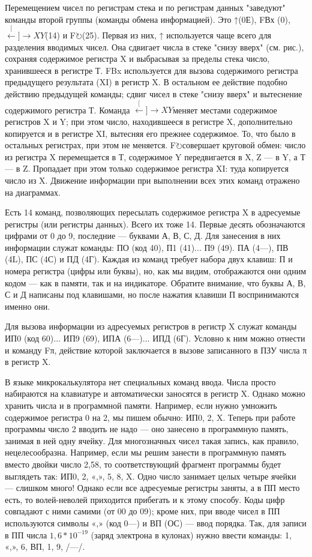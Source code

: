 \documentclass[11pt,a4paper,oneside]{article}
\def\XY{$\stackrel[\leftarrow]{\rightarrow}{XY}$}
\def\FO{F$\circlearrowright$}
\begin{document}
Перемещением чисел по регистрам стека и по регистрам данных "заведуют" команды второй группы (команды обмена информацией). Это ↑(0Е), FВх (0), \XY (14) и \FO (25). Первая из них, ↑ используется чаще всего для разделения вводимых чисел. Она сдвигает числа в стеке "снизу вверх" (см. рис.), сохраняя содержимое регистра X и выбрасывая за пределы стека число, хранившееся в регистре Т. FBx используется для вызова содержимого регистра предыдущего результата (XI) в регистр X. В остальном ее действие подобно действию предыдущей команды; сдвиг чисел в стеке "снизу вверх" и вытеснение содержимого регистра Т. Команда \XY меняет местами содержимое регистров X и Y; при этом число, находившееся в регистре X, дополнительно копируется и в регистре XI, вытесняя его прежнее содержимое. То, что было в остальных регистрах, при этом не меняется. \FO совершает круговой обмен: число из регистра X перемещается в Т, содержимое Y передвигается в X, Z — в Y, а Т — в Z. Пропадает при этом только содержимое регистра XI: туда копируется число из X. Движение информации при выполнении всех этих команд отражено на диаграммах.

Есть 14 команд, позволяющих пересылать содержимое регистра X в адресуемые регистры (или регистры данных). Всего их тоже 14. Первые десять обозначаются цифрами от 0 до 9, последние — буквами А, В, С, Д. Для занесения в них информации служат команды: ПО (код 40), П1 (41)... П9 (49). ПА (4—), ПВ (4L), ПС (4С) и ПД (4Г). Каждая из команд требует набора двух клавиш: П и номера регистра (цифры или буквы), но, как мы видим, отображаются они одним кодом — как в памяти, так и на индикаторе. Обратите внимание, что буквы А, В, С и Д написаны под клавишами, но после нажатия клавиши П воспринимаются именно они.

Для вызова информации из адресуемых регистров в регистр X служат команды ИП0 (код 60)... ИП9 (69), ИПА (6—)... ИПД (6Г). Условно к ним можно отнести и команду Fπ, действие которой заключается в вызове записанного в ПЗУ числа π в регистр X.

В языке микрокалькулятора нет специальных команд ввода. Числа просто набираются на клавиатуре и автоматически заносятся в регистр X. Однако можно хранить числа и в программной памяти. Например, если нужно умножить содержимое регистра 0 на 2, мы пишем обычно: ИП0, 2, X. Теперь при работе программы число 2 вводить не надо — оно занесено в программную память, занимая в ней одну ячейку. Для многозначных чисел такая запись, как правило, нецелесообразна. Например, если мы решим занести в программную память вместо двойки число 2,58, то соответствующий фрагмент программы будет выглядеть так: ИП0, 2, «,», 5, 8, X. Одно число занимает целых четыре ячейки — слишком много! Однако если все адресуемые регистры заняты, а в ПП место есть, то волей-неволей приходится прибегать и к этому способу. Коды цифр совпадают с ними самими (от 00 до 09); кроме них, при вводе чисел в ПП используются символы «,» (код 0—) и ВП (ОС) — ввод порядка. Так, для записи в ПП числа $1,6*10^{-19}$ (заряд электрона в кулонах) нужно ввести команды: 1, «,», 6, ВП, 1, 9, /—/.
\end{document}
